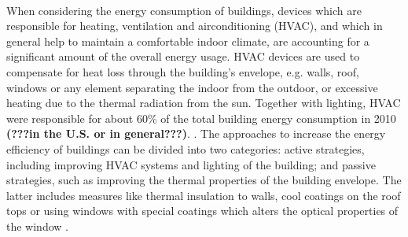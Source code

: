 \\
%
When considering the energy consumption of buildings, devices which are responsible for
heating, ventilation and airconditioning (HVAC), and which
in general help to maintain a comfortable indoor climate,
are accounting for a significant amount of the overall energy usage. 
%
HVAC devices are used to compensate for heat loss through the building's envelope,
e.g. walls, roof, windows or any element separating the indoor from the outdoor, 
or excessive heating due to the thermal radiation from the sun.
Together with lighting, HVAC were responsible for about 60\% of the total building energy consumption 
in 2010
\textbf{(???in the U.S. or in general???)}.
\cite{buildingsEnergyDatabook}. 
%
The approaches to increase the energy efficiency of buildings can be divided into two 
categories: active strategies, including improving HVAC systems and lighting of the building;
and passive strategies, such as improving the thermal properties of the building envelope. 
The latter includes measures like thermal insulation to walls, cool coatings on the roof tops
or using windows with special coatings which alters the optical properties of the window 
\cite{Bojic2001,Cheung2005,Synnefa2007,Sadineni2011}.
%
